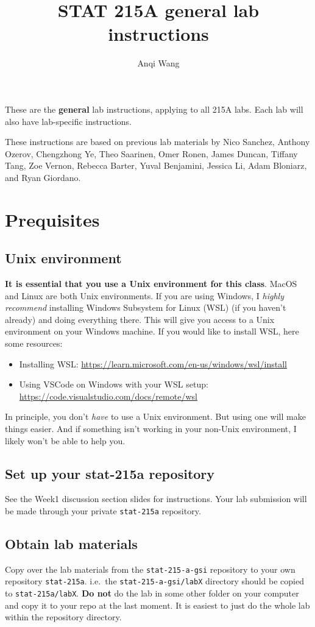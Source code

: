 \documentclass[letterpaper,12pt]{article}
\title{STAT 215A general lab instructions\vspace{-1em}}
\author{Anqi Wang}
\begin{document}
\maketitle

These are the \textbf{general} lab instructions, applying to all 215A labs. Each lab will also have lab-specific instructions. 

\tableofcontents

These instructions are based on previous lab materials by Nico Sanchez, Anthony Ozerov, Chengzhong Ye, Theo Saarinen, Omer Ronen, James Duncan, Tiffany Tang, Zoe Vernon, Rebecca Barter, Yuval Benjamini, Jessica Li, Adam Bloniarz, and Ryan Giordano.


\section{Prequisites}
\subsection{Unix environment}
\textbf{It is essential that you use a Unix environment for this class}. MacOS and Linux are both Unix environments. If you are using Windows, I \textit{highly recommend} installing Windows Subsystem for Linux (WSL) (if you haven't already) and doing everything there. This will give you access to a Unix environment on your Windows machine. If you would like to install WSL, here some resources:
\begin{itemize}
    \item Installing WSL: \url{https://learn.microsoft.com/en-us/windows/wsl/install}
    \item Using VSCode on Windows with your WSL setup: \url{https://code.visualstudio.com/docs/remote/wsl}
\end{itemize}
In principle, you don't \textit{have} to use a Unix environment. But using one will make things easier. And if something isn't working in your non-Unix environment, I likely won't be able to help you.
\subsection{Set up your stat-215a repository}
See the Week1 discussion section slides for instructions. Your lab submission will be made through your private \texttt{stat-215a} repository.
\subsection{Obtain lab materials}
Copy over the lab materials from the \texttt{stat-215-a-gsi} repository to your own repository \texttt{stat-215a}. i.e.~the \texttt{stat-215-a-gsi/labX} directory should be copied to \texttt{stat-215a/labX}. \textbf{Do not} do the lab in some other folder on your computer and copy it to your repo at the last moment. It is easiest to just do the whole lab within the repository directory.
\end{document}
